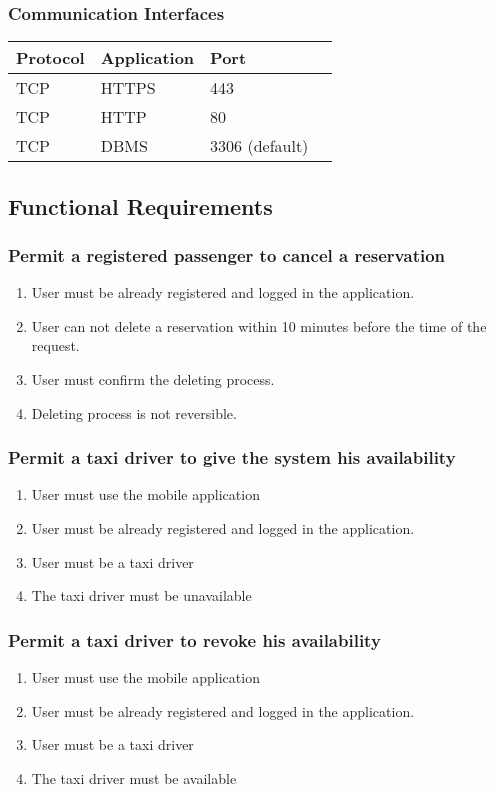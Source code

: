 		\subsubsection{Communication Interfaces}
			\begin{center}
				\begin{tabular}{ | l | l | l | p{5cm} |}
					\hline
					Protocol & Application & Port 	\\ \hline
					TCP & HTTPS & 443				\\ \hline
					TCP & HTTP  & 80				\\ \hline
					TCP & DBMS  & 3306 (default)	\\ \hline
				\end{tabular}
			\end{center}
	\subsection{Functional Requirements}
		\subsubsection{Permit a registered passenger to cancel a reservation}
			\begin{enumerate}[label=\bfseries R\arabic*:]
				\item User must be already registered and logged in the application.
				\item User can not delete a reservation within 10 minutes before the time of the request.
				\item User must confirm the deleting process.
				\item Deleting process is not reversible.
			\end{enumerate}
		\subsubsection{Permit a taxi driver to give the system his availability}
			\begin{enumerate}[label=\bfseries R\arabic*:]
				\item User must use the mobile application
				\item User must be already registered and logged in the application.
				\item User must be a taxi driver
				\item The taxi driver must be unavailable
			\end{enumerate}
		\subsubsection{Permit a taxi driver to revoke his availability}
			\begin{enumerate}[label=\bfseries R\arabic*:]
				\item User must use the mobile application
				\item User must be already registered and logged in the application.
				\item User must be a taxi driver
				\item The taxi driver must be available
			\end{enumerate}
